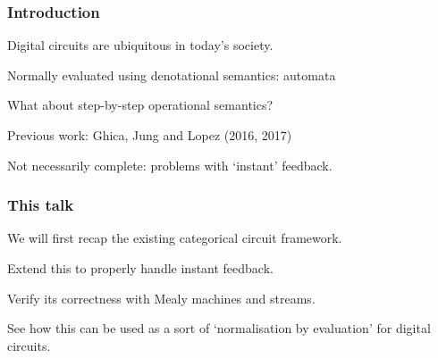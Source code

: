 \begin{frame}
    \frametitle{Introduction}

    Digital circuits are ubiquitous in today's society.

    \pause

    Normally evaluated using \alert{denotational semantics}: automata

    \pause

    What about step-by-step \alert{operational semantics}?

    \pause

    \alert{Previous work:} Ghica, Jung and Lopez (2016, 2017)

    \pause

    Not necessarily \alert{complete}: problems with `instant' feedback.

\end{frame}

\begin{frame}
    \frametitle{This talk}

    We will first recap the existing \alert{categorical circuit framework}.

    \pause

    Extend this to properly handle \alert{instant feedback}.

    \pause

    Verify its correctness with \alert{Mealy machines} and \alert{streams}.

    \pause

    See how this can be used as a sort of `normalisation by evaluation' for digital circuits.

\end{frame}